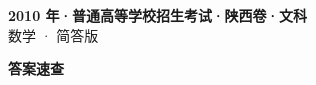 \documentclass[zihao=-4, a4paper]{ctexart}
\begin{document}
\begin{center}
  {\Large\bfseries 2010 年·普通高等学校招生考试·陕西卷·文科}\\[4pt]
  {\large 数学 · 简答版}
\end{center}
\medskip
{}

\clearpage
{}
\begin{center}{\Large\bfseries 答案速查}\end{center}
\medskip

\end{document}
